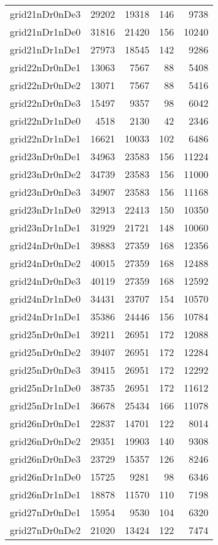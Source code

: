 \begin{longtable}{lrrrr}
grid21nDr0nDe3 & 29202 & 19318 & 146 & 9738 \\
grid21nDr1nDe0 & 31816 & 21420 & 156 & 10240 \\
grid21nDr1nDe1 & 27973 & 18545 & 142 & 9286 \\
grid22nDr0nDe1 & 13063 & 7567 & 88 & 5408 \\
grid22nDr0nDe2 & 13071 & 7567 & 88 & 5416 \\
grid22nDr0nDe3 & 15497 & 9357 & 98 & 6042 \\
grid22nDr1nDe0 & 4518 & 2130 & 42 & 2346 \\
grid22nDr1nDe1 & 16621 & 10033 & 102 & 6486 \\
grid23nDr0nDe1 & 34963 & 23583 & 156 & 11224 \\
grid23nDr0nDe2 & 34739 & 23583 & 156 & 11000 \\
grid23nDr0nDe3 & 34907 & 23583 & 156 & 11168 \\
grid23nDr1nDe0 & 32913 & 22413 & 150 & 10350 \\
grid23nDr1nDe1 & 31929 & 21721 & 148 & 10060 \\
grid24nDr0nDe1 & 39883 & 27359 & 168 & 12356 \\
grid24nDr0nDe2 & 40015 & 27359 & 168 & 12488 \\
grid24nDr0nDe3 & 40119 & 27359 & 168 & 12592 \\
grid24nDr1nDe0 & 34431 & 23707 & 154 & 10570 \\
grid24nDr1nDe1 & 35386 & 24446 & 156 & 10784 \\
grid25nDr0nDe1 & 39211 & 26951 & 172 & 12088 \\
grid25nDr0nDe2 & 39407 & 26951 & 172 & 12284 \\
grid25nDr0nDe3 & 39415 & 26951 & 172 & 12292 \\
grid25nDr1nDe0 & 38735 & 26951 & 172 & 11612 \\
grid25nDr1nDe1 & 36678 & 25434 & 166 & 11078 \\
grid26nDr0nDe1 & 22837 & 14701 & 122 & 8014 \\
grid26nDr0nDe2 & 29351 & 19903 & 140 & 9308 \\
grid26nDr0nDe3 & 23729 & 15357 & 126 & 8246 \\
grid26nDr1nDe0 & 15725 & 9281 & 98 & 6346 \\
grid26nDr1nDe1 & 18878 & 11570 & 110 & 7198 \\
grid27nDr0nDe1 & 15954 & 9530 & 104 & 6320 \\
grid27nDr0nDe2 & 21020 & 13424 & 122 & 7474 \\

\end{longtable}
